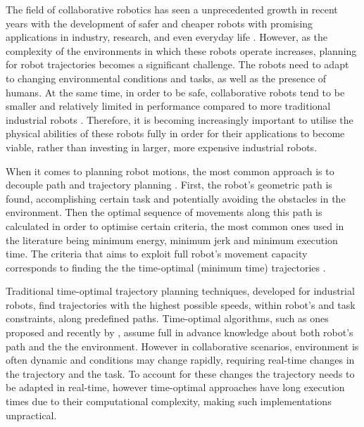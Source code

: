 The field of collaborative robotics has seen a unprecedented growth in recent years with the development of safer and cheaper robots with promising applications in industry, research, and even everyday life \cite{ajoudani2018progress}. However, as the complexity of the environments in which these robots operate increases, planning for robot trajectories becomes a significant challenge.  The robots need to adapt to changing environmental conditions and tasks, as well as the presence of humans. 
At the same time, in order to be safe, collaborative robots tend to be smaller and relatively limited in performance compared to more traditional industrial robots \cite{smu}. Therefore, it is becoming increasingly important to utilise the physical abilities of these robots fully in order for their applications to become viable, rather than investing in larger, more expensive industrial robots. 


When it comes to planning robot motions, the most common approach is to decouple path and trajectory planning \cite{Pardo1996}. First, the robot's geometric path is found, accomplishing certain task and potentially avoiding the obstacles in the environment. Then the optimal sequence of movements along this path is calculated in order to optimise certain criteria, the most common ones used in the literature being minimum energy, minimum jerk and minimum execution time. The criteria that aims to exploit full robot's movement capacity corresponds to finding the the time-optimal (minimum time) trajectories \cite{gasparetto2012trajectory}. 

Traditional time-optimal trajectory planning techniques, developed for industrial robots, find trajectories with the highest possible speeds, within robot's and task constraints, along predefined paths. Time-optimal algorithms, such as ones proposed \citet{bobrow1985time} and recently by \citet{Pham2018}, assume full in advance knowledge about both robot's path and the the environment. However in collaborative scenarios, environment is often dynamic and conditions may change rapidly, requiring real-time changes in the trajectory and the task. To account for these changes the trajectory needs to be adapted in real-time, however time-optimal approaches have long execution times due to their computational complexity, making such implementations unpractical. 


